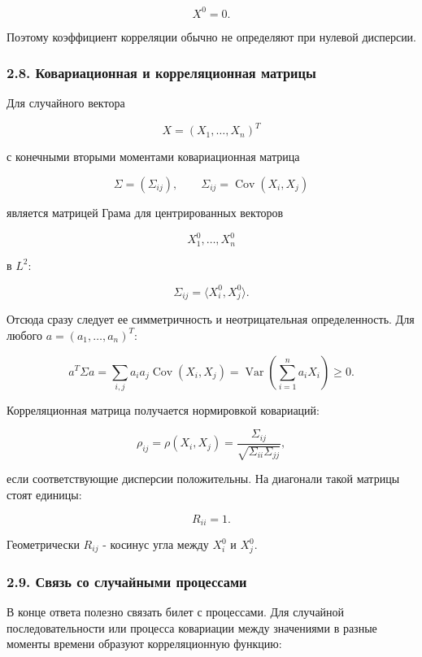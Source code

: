 \documentclass[
  11pt,
  a4paper,
]{article}
\begin{document}
\[
X^0=0.
\]

Поэтому коэффициент корреляции обычно не определяют при нулевой
дисперсии.

\subsubsection{2.8. Ковариационная и корреляционная
матрицы}\label{ux43aux43eux432ux430ux440ux438ux430ux446ux438ux43eux43dux43dux430ux44f-ux438-ux43aux43eux440ux440ux435ux43bux44fux446ux438ux43eux43dux43dux430ux44f-ux43cux430ux442ux440ux438ux446ux44b}

Для случайного вектора

\[
X=(X_1,\ldots,X_n)^T
\]

с конечными вторыми моментами ковариационная матрица

\[
\Sigma=(\Sigma_{ij}),
\qquad
\Sigma_{ij}=\operatorname{Cov}(X_i,X_j)
\]

является матрицей Грама для центрированных векторов

\[
X_1^0,\ldots,X_n^0
\]

в \(L^2\):

\[
\Sigma_{ij}=\langle X_i^0,X_j^0\rangle.
\]

Отсюда сразу следует ее симметричность и неотрицательная определенность.
Для любого \(a=(a_1,\ldots,a_n)^T\):

\[
a^T\Sigma a
=
\sum_{i,j}a_i a_j\operatorname{Cov}(X_i,X_j)
=
\operatorname{Var}\left(\sum_{i=1}^n a_iX_i\right)
\ge0.
\]

Корреляционная матрица получается нормировкой ковариаций:

\[
\rho_{ij}
=
\rho(X_i,X_j)
=
\frac{\Sigma_{ij}}{\sqrt{\Sigma_{ii}\Sigma_{jj}}},
\]

если соответствующие дисперсии положительны. На диагонали такой матрицы
стоят единицы:

\[
R_{ii}=1.
\]

Геометрически \(R_{ij}\) - косинус угла между \(X_i^0\) и \(X_j^0\).

\subsubsection{2.9. Связь со случайными
процессами}\label{ux441ux432ux44fux437ux44c-ux441ux43e-ux441ux43bux443ux447ux430ux439ux43dux44bux43cux438-ux43fux440ux43eux446ux435ux441ux441ux430ux43cux438}

В конце ответа полезно связать билет с процессами. Для случайной
последовательности или процесса ковариации между значениями в разные
моменты времени образуют корреляционную функцию:
\end{document}
